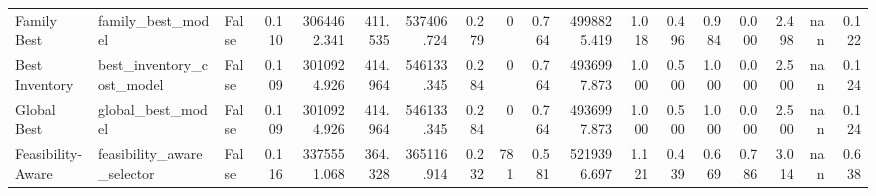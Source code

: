 \begin{table}
{\begin{tabular}{lllrrrrrrrrrrrrrrr}
       Family Best &           family\_best\_model &                       False & 0.110 &     3064462.341 &              411.535 &         537406.724 &                     0.279 &                   0 &                       0.764 &              4998825.419 &                           1.018 &                            0.496 &                           0.984 &                        0.000 &                  2.498 &               nan &                  0.122 \\
    Best Inventory &   best\_inventory\_cost\_model &                       False & 0.109 &     3010924.926 &              414.964 &         546133.345 &                     0.284 &                   0 &                       0.764 &              4936997.873 &                           1.000 &                            0.500 &                           1.000 &                        0.000 &                  2.500 &               nan &                  0.124 \\
       Global Best &           global\_best\_model &                       False & 0.109 &     3010924.926 &              414.964 &         546133.345 &                     0.284 &                   0 &                       0.764 &              4936997.873 &                           1.000 &                            0.500 &                           1.000 &                        0.000 &                  2.500 &               nan &                  0.124 \\
 Feasibility-Aware &  feasibility\_aware\_selector &                       False & 0.116 &     3375551.068 &              364.328 &         365116.914 &                     0.232 &                 781 &                       0.581 &              5219396.697 &                           1.121 &                            0.439 &                           0.669 &                        0.786 &                  3.014 &               nan &                  0.638 \\
\bottomrule
\end{tabular}
}

\end{table}
